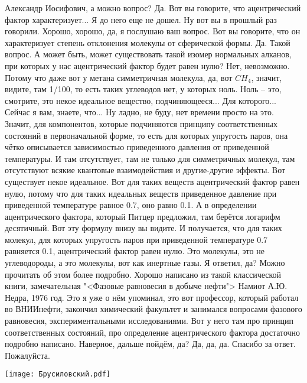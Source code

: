 \documentclass[main.tex]{subfiles}
\begin{document}
Александр Иосифович, а можно вопрос?
Да.
Вот вы говорите, что ацентрический фактор характеризует...
Я до него еще не дошел.
Ну вот вы в прошлый раз говорили.
Хорошо, хорошо, да, я послушаю ваш вопрос.
Вот вы говорите, что он характеризует степень отклонения молекулы от сферической формы.
Да.
Такой вопрос. А может быть, может существовать такой изомер нормальных алканов, при которых у нас ацентрический фактор будет равен нулю?
Нет, невозможно.
Потому что даже вот у метана симметричная молекула, да, вот $CH_4$, значит, видите, там 1/100, то есть таких углеводов нет, у которых ноль.
Ноль -- это, смотрите, это некое идеальное вещество, подчиняющееся...
Для которого...
Сейчас я вам, знаете, что...
Ну ладно, не буду, нет времени просто на это.
Значит, для компонентов, которые подчиняются принципу соответственных состояний в первоначальной форме, то есть для которых упругость паров, она чётко описывается зависимостью приведенного давления от приведенной температуры.
И там отсутствует, там не только для симметричных молекул, там отсутствуют всякие квантовые взаимодействия и другие-другие эффекты.
Вот существует некое идеальное.
Вот для таких веществ ацентрический фактор равен нулю, потому что для таких идеальных веществ приведенное давление при приведенной температуре равное 0.7, оно равно 0.1.
А в определении ацентрического фактора, который Питцер предложил, там берётся логарифм десятичный.
Вот эту формулу внизу вы видите.
И получается, что для таких молекул, для которых упругость паров при приведенной температуре 0.7 равняется 0.1, ацентрический фактор равен нулю.
Это молекулы, это не углеводороды, а это молекулы, вот как инертные газы.
Я ответил, да?
Можно прочитать об этом более подробно.
Хорошо написано из такой классической книги, замечательная "<Фазовые равновесия в добыче нефти"> Намиот А.Ю. Недра, 1976 год.
Это я уже о нём упоминал, это вот профессор, который работал во ВНИИнефти, закончил химический факультет и занимался вопросами фазового равновесия, экспериментальными исследованиями.
Вот у него там про принцип соответственных состояний, про определение ацентрического фактора достаточно подробно написано.
Наверное, дальше пойдём, да?
Да, да, да. Спасибо за ответ.
Пожалуйста.


\begin{center}
\texttt{[image: Брусиловский.pdf]}
\end{center}
\end{document}
